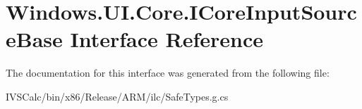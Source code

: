 \hypertarget{interface_windows_1_1_u_i_1_1_core_1_1_i_core_input_source_base}{}\section{Windows.\+U\+I.\+Core.\+I\+Core\+Input\+Source\+Base Interface Reference}
\label{interface_windows_1_1_u_i_1_1_core_1_1_i_core_input_source_base}


The documentation for this interface was generated from the following file\+:\begin{DoxyCompactItemize}
\item 
I\+V\+S\+Calc/bin/x86/\+Release/\+A\+R\+M/ilc/Safe\+Types.\+g.\+cs\end{DoxyCompactItemize}
